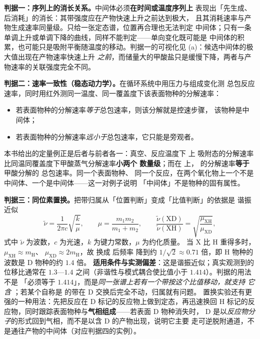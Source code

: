 \begin{principle}
\textbf{判据一：序列上的消长关系。}中间体必须\textbf{在时间或温度序列上}
表现出「先生成、后消耗」的消长：其带强度应在产物快速上升之前达到极大，
且其消耗速率与产物生成速率同量级。只给一张定态谱，位置再合理也无法判定
中间体；只有一条单调上升或单调下降的曲线，同样不能判定——单向变化既可能是
中间体的积累，也可能只是吸附平衡随温度的移动。判据一的可视化见
(a)：候选中间体的极大值出现在产物速率快速上升
\emph{之前}，而储量大的甲酸盐只是缓慢下降，两者与产物速率的关联强度完全不同。

\textbf{判据二：速率一致性（稳态动力学）。}在循环系统中用压力与组成变化测
总包反应速率，同时用红外测同一温度、同一覆盖度下该表面物种的分解速率：
\begin{itemize}
  \item 若表面物种的分解速率\emph{等于}总包速率，则该分解就是控速步骤，
        该物种是中间体；
  \item 若表面物种的分解速率\emph{远小于}总包速率，它只能是旁观者。
\end{itemize}
本书给出的定量例正是后者与前者各一：真空、反应温度下  上
 吸附态的分解速率比同温同覆盖度下甲酸蒸气分解速率\textbf{小两个
数量级}；而在  上， 的分解速率\textbf{等于}甲酸分解的
总包速率。同一个表面物种、
同一个反应，在两个氧化物上一个不是中间体、一个是中间体——这一对例子说明
「中间体」不是物种的固有属性。

\textbf{判据三：同位素置换。}把带归属从「位置判断」变成「比值判断」的依据是
谐振近似
\begin{equation}
  \tilde{\nu}=\frac{1}{2\pi c}\sqrt{\frac{k}{\mu}},\qquad
  \mu=\frac{m_{1}m_{2}}{m_{1}+m_{2}},\qquad
  \frac{\tilde{\nu}(\mathrm{XD})}{\tilde{\nu}(\mathrm{XH})}
  =\sqrt{\frac{\mu_{\mathrm{XH}}}{\mu_{\mathrm{XD}}}},
  \label{eq:ch07c-isotope}
\end{equation}
式中 $\tilde{\nu}$ 为波数，$c$ 为光速，$k$ 为键力常数，$\mu$ 为约化质量。
当 X 比 H 重得多时，$\mu_{\mathrm{XH}}\approx m_{\mathrm{H}}$、
$\mu_{\mathrm{XD}}\approx 2m_{\mathrm{H}}$，故 换成  后频率
降到约 $1/\sqrt{2}\approx0.71$ 倍，即 H 物种的波数是 D 物种的约 $1.4$ 倍。
\textbf{适用条件与实测偏差}：这是谐振近似；真实观测到的位移比通常在
$1.3$—$1.4$ 之间（非谐性与模式耦合使比值小于 $1.414$）。判据的用法不是
「必须等于 $1.414$」，而是\emph{同一张谱上若有一个带按这个比值移动，就支持
它含 }；若某个自称是  的带在 D 交换后完全不动，归属就有问题。
置换实验还有更强的一种用法：先把反应在 D 标记的反应物上做到定态，再迅速换回
H 标记的反应物，同时跟踪表面物种与\textbf{气相组成}——若表面 D 物种消失时，
D 是以\emph{反应物分子}的形式回到气相，而不是以含 D 的产物出现，说明它主要
走可逆脱附通道，不是通往产物的中间体（对应判据四的实例）。


\end{principle}
